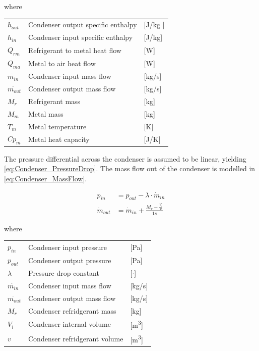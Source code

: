 where 

\begin{center}
	\begin{tabular}{l p{8cm} l}
		$h_{out}$				&  Condenser output specific enthalpy			& [\si{J}/\si{kg} ]\\
		$h_{in}$					&  Condenser input specific enthalpy 			& [\si{J}/\si{kg}] \\
		$Q_{rm}$					& Refrigerant to metal heat flow 			& [\si{W}] \\
		$Q_{ma}$					& Metal to air heat flow						& [\si{W}] \\
		$\dot{m_{in}}$			& Condenser input mass flow 			& [\si{kg}/\si{s}] \\
		$\dot{m_{out}}$			& Condenser output mass flow 		& [\si{kg}/\si{s}] \\
		$M_r$						& Refrigerant mass 								& [\si{kg}] \\
		$M_m$						& Metal mass												& [\si{kg}] \\
		$T_m$						& Metal temperature 							& [\si{K}]\\
		$Cp_m$					& Metal heat capacity 						& [\si{J}/\si{K}]\\
	\end{tabular}
\end{center}

The pressure differential across the condenser is assumed to be linear, yielding \cref{eq:Condenser_PressureDrop}.
The mass flow out of the condenser is modelled in \cref{eq:Condenser_MassFlow}.


\begin{align}
	p_{in}	 			& = p_{out} - \lambda \cdot \dot{m}_{in}  				\label{eq:Condenser_PressureDrop}\\
	\dot{m}_{out}		& = \dot{m}_{in} + \frac{M_r - \frac{V_i}{v}}{1s}		\label{eq:Condenser_MassFlow}
\end{align}

where 

\begin{center}
	\begin{tabular}{l p{8cm} l}
		$p_{in}$				&	Condenser input pressure					& [\si{Pa}] \\
		$p_{out}$				&	Condenser output pressure					& [\si{Pa}] \\
		$\lambda$				& 	Pressure drop constant	 					& [$\cdot$] \\
		$\dot{m_{in}}$			& 	Condenser input mass flow 					& [\si{kg}/\si{s}] \\
		$\dot{m_{out}}$			& 	Condenser output mass flow 					& [\si{kg}/\si{s}] \\	
		$M_{r}$					&	Condenser refridgerant mass					& [\si{kg}] \\
		$V_{i}$					&	Condenser internal volume					& [\si{m^3}] \\
		$v$						&	Condenser refridgerant volume				& [\si{m^3}] \\
	\end{tabular}
\end{center}


